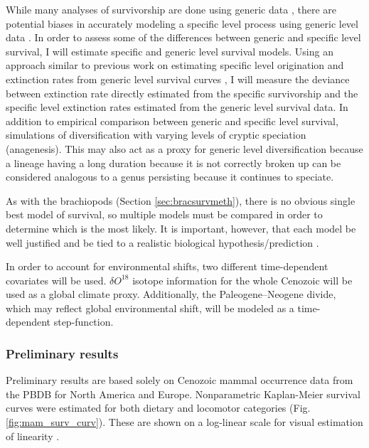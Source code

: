 \documentclass[12pt,letterpaper]{article}
\begin{document}
While many analyses of survivorship are done using generic data \citep{Tomiya2013,Liow2008,Harnik2013,Finnegan2008,Foote2006}, there are potential biases in accurately modeling a specific level process using generic level data \citep{Raup1975,Sepkoski1975,Simpson2006,Raup1991a,VanValen1979}. In order to assess some of the differences between generic and specific level survival, I will estimate specific and generic level survival models. Using an approach similar to previous work on estimating specific level origination and extinction rates from generic level survival curves \citep{Foote1988}, I will measure the deviance between extinction rate directly estimated from the specific survivorship and the specific level extinction rates estimated from the generic level survival data. In addition to empirical comparison between generic and specific level survival, simulations of diversification with varying levels of cryptic speciation (anagenesis). This may also act as a proxy for generic level diversification because a lineage having a long duration because it is not correctly broken up can be considered analogous to a genus persisting because it continues to speciate.

As with the brachiopods (Section \ref{sec:bracsurvmeth}), there is no obvious single best model of survival, so multiple models must be compared in order to determine which is the most likely. It is important, however, that each model be well justified and be tied to a realistic biological hypothesis/prediction \citep{Burnham2002a}. 

In order to account for environmental shifts, two different time-dependent covariates will be used. \(\delta O^{18}\) isotope information for the whole Cenozoic \citep{Zachos2008} will be used as a global climate proxy. Additionally, the Paleogene--Neogene divide, which may reflect global environmental shift, will be modeled as a time-dependent step-function.

\subsubsection{Preliminary results}
Preliminary results are based solely on Cenozoic mammal occurrence data from the PBDB for North America and Europe. Nonparametric Kaplan-Meier survival curves were estimated for both dietary and locomotor categories (Fig. \ref{fig:mam_surv_curv}). These are shown on a log-linear scale for visual estimation of linearity \citep{VanValen1973,VanValen1979}.
\end{document}
